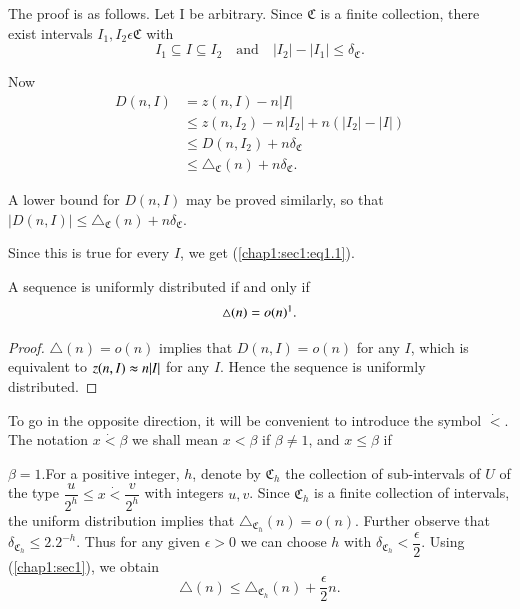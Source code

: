 The proof is as follows. Let I be arbitrary. Since $\mathfrak{C}$ is a finite collection, there exist intervals $I_{1}, I_{2} \epsilon \mathfrak{C}$ with
$$
I_{1} \subseteq I \subseteq I_{2}\quad\text{and}\quad|I_{2}| - |I_{1}| \leq \delta_{\mathfrak{C}}.
$$

Now
\begin{align*}
D(n, I) & = z(n, I) - n|I|\\
        & \leq z(n, I_{2}) - n|I_{2}| + n(|I_{2}| - |I|)\\
        & \leq D(n, I_{2}) + n\delta_{\mathfrak{C}}\\
        & \leq \triangle_{\mathfrak{C}} (n) + n\delta_{\mathfrak{C}}.
\end{align*}

A lower bound for $D(n, I)$ may be proved similarly, so that 
$|D(n, I)| \leq \triangle_{\mathfrak{C}} (n) + n\delta_{\mathfrak{C}}.$

Since this is true for every $I$, we get (\ref{chap1:sec1:eq1.1}).

\begin{lemma}\label{chap1:sec1:lem1A}
  A sequence is uniformly distributed if and only if 
  $$
  \triangle(n) = o(n) \footnotemark[1].
  $$
\end{lemma}

\begin{proof}
 $\triangle(n) = o(n)$ implies that $D(n, I) = o(n)$ for any $I$, which is equivalent to $z(n, I) \thickapprox n|I|$ for any $I$. Hence the sequence is uniformly distributed.
\end{proof}

To go in the opposite direction, it will be convenient to introduce the symbol $\dot{<}$. The notation $x \dot{<} \beta$ we shall mean $x <\beta$ if $\beta \neq 1$, and $x \leq \beta$ if

$\beta = 1$.\pageoriginale For a positive integer, $h$, denote by $\mathfrak{C}_{h}$ the collection of sub-intervals of $U$ of the type $\dfrac{u}{2^{h}} \leq x \dot{<} \dfrac{v}{2^{h}}$ with integers $u, v$. Since $\mathfrak{C}_{h}$ is a finite collection of intervals, the uniform distribution implies that $\triangle_{\mathfrak{C}_{h}} (n) = o(n)$. Further observe that $\delta_{\mathfrak{C}_{h}} \leq 2.2^{-h}$. Thus for any given $\epsilon > 0$ we can choose $h$ with $\delta_{\mathfrak{C}_{h}} < \dfrac{\epsilon}{2}$. Using (\ref{chap1:sec1}), we obtain
$$
\triangle(n) \leq \triangle_{\mathfrak{C}_{h}} (n) + \dfrac{\epsilon}{2} n.
$$

